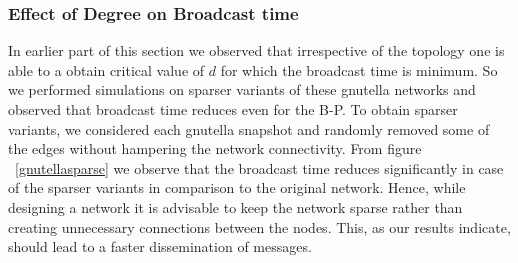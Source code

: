 \subsubsection{Effect of Degree on Broadcast time}

  In earlier part of this section we observed that irrespective of the topology one is able to a 
obtain critical value of $d$ for which the 
  broadcast time is minimum. So we performed simulations on sparser variants of these gnutella networks
and observed that broadcast time reduces even for the B-P. To obtain sparser variants, we considered each gnutella snapshot and randomly removed 
some of the edges 
without hampering the network connectivity. From figure ~\ref{gnutellasparse} we observe that the broadcast time reduces significantly
in case of the sparser variants in comparison to the original network.
Hence, while designing a network it is advisable to keep the network sparse rather than creating unnecessary connections between the nodes.
This, as our results indicate, should lead to a faster dissemination of messages.


